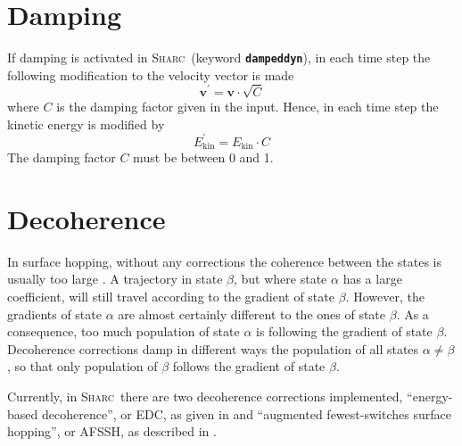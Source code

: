 \documentclass[a4paper,10pt,DIV=15,openany]{scrbook}
\newcommand{\sharc}{\textsc{Sharc}}
\newcommand{\ttt}[1]{\textbf{\texttt{#1}}}
\newcommand{\VEC}[1]{\ensuremath{\mathbf{#1}}}
\begin{document}

\section{Damping}\label{met:damping}

If damping is activated in \sharc\ (keyword \ttt{dampeddyn}), in each time step the following modification to the velocity vector is made
\begin{equation}
  \VEC{v}^\prime=\VEC{v}\cdot\sqrt{C}
\end{equation}
where $C$ is the damping factor given in the input. Hence, in each time step the kinetic energy is modified by
\begin{equation}
  E_{\text{kin}}^\prime=E_{\text{kin}}\cdot C
\end{equation}
The damping factor $C$ must be between 0 and 1.



% 



\section{Decoherence}\label{met:decoherence}

In surface hopping, without any corrections the coherence between the states is usually too large \cite{Granucci2007JCP}. A trajectory in state $\beta$, but where state $\alpha$ has a large coefficient, will still travel according to the gradient of state $\beta$. However, the gradients of state $\alpha$ are almost certainly different to the ones of state $\beta$. As a consequence, too much population of state $\alpha$ is following the gradient of state $\beta$. Decoherence corrections damp in different ways the population of all states $\alpha\neq\beta$, so that only population of $\beta$ follows the gradient of state $\beta$.

Currently, in \sharc\ there are two decoherence corrections implemented, ``energy-based decoherence'', or EDC, as given in \cite{Granucci2010JCP} and ``augmented fewest-switches surface hopping'', or AFSSH, as described in \cite{Jain2016JCTC}.
\end{document}
